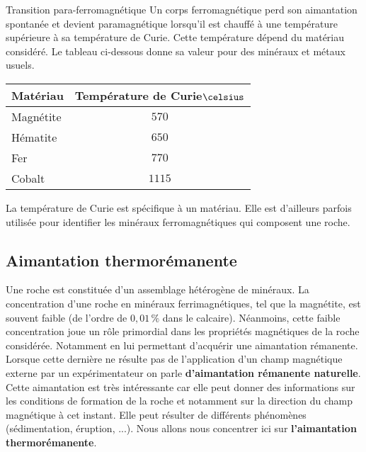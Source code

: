 \begin{defn}{Transition para-ferromagnétique}
	Un corps ferromagnétique perd son aimantation spontanée et devient 
	paramagnétique lorsqu'il est chauffé à une température supérieure à sa température
	de Curie. Cette température dépend du matériau considéré. Le tableau ci-dessous
	donne sa valeur pour des minéraux et métaux usuels.

	\begin{center}
	\begin{tabular}{l|c}
		\textbf{Matériau} & \textbf{Température de Curie}$\celsius$  \\\hline
		Magnétite 	 & $570$ \\[0.5em]
		Hématite 	 & $650$ \\[0.5em]
		Fer     & $770$\\[0.5em]
		Cobalt     & $1115$\\[0.5em]
	\end{tabular}
	\end{center}
\end{defn}

\begin{rema}
	La température de Curie est spécifique à un matériau. Elle est d'ailleurs parfois
	utilisée pour identifier les minéraux ferromagnétiques qui composent une
	roche.
\end{rema}

\newpage

\subsection{Aimantation thermorémanente}
Une roche est constituée d'un assemblage hétérogène de minéraux. La concentration d'une
roche en minéraux ferrimagnétiques, tel que la magnétite, est souvent faible 
(de l'ordre de $0,01\,\%$ dans le calcaire). Néanmoins, cette faible concentration joue un
rôle primordial dans les propriétés magnétiques de la roche considérée. Notamment
en lui permettant d'acquérir une aimantation rémanente. Lorsque cette dernière
ne résulte pas de l'application d'un champ magnétique externe par un expérimentateur
on parle \textbf{d'aimantation rémanente naturelle}. Cette aimantation est très intéressante
car elle peut donner des informations sur les conditions de formation de la roche
et notamment sur la direction du champ magnétique à cet instant. Elle peut 
résulter de différents phénomènes (sédimentation, éruption, ...). Nous allons
nous concentrer ici sur \textbf{l'aimantation thermorémanente}.

